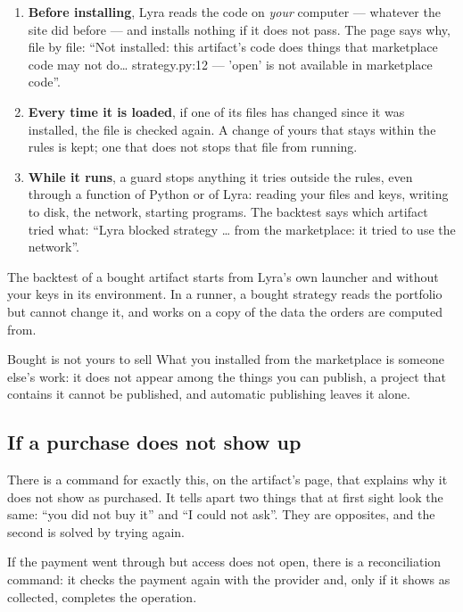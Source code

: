 \begin{enumerate}
  \item \textbf{Before installing}, Lyra reads the code on \emph{your}
        computer --- whatever the site did before --- and installs nothing if
        it does not pass. The page says why, file by file: \enquote{Not
        installed: this artifact's code does things that marketplace code may
        not do\ldots{} strategy.py:12 --- 'open' is not available in
        marketplace code}.
  \item \textbf{Every time it is loaded}, if one of its files has changed
        since it was installed, the file is checked again. A change of yours
        that stays within the rules is kept; one that does not stops that file
        from running.
  \item \textbf{While it runs}, a guard stops anything it tries outside the
        rules, even through a function of Python or of Lyra: reading your
        files and keys, writing to disk, the network, starting programs. The
        backtest says which artifact tried what: \enquote{Lyra blocked
        strategy \ldots{} from the marketplace: it tried to use the
        network}.
\end{enumerate}

\noindent
The backtest of a bought artifact starts from Lyra's own launcher and without
your keys in its environment. In a runner, a bought strategy reads the
portfolio but cannot change it, and works on a copy of the data the orders
are computed from.

\begin{nota}{Bought is not yours to sell}
What you installed from the marketplace is someone else's work: it does not
appear among the things you can publish, a project that contains it cannot
be published, and automatic publishing leaves it alone.
\end{nota}

\subsection{If a purchase does not show up}

There is a command for exactly this, on the artifact's page, that explains
why it does not show as purchased. It tells apart two things that at first
sight look the same: \enquote{you did not buy it} and \enquote{I could not
ask}. They are opposites, and the second is solved by trying again.

If the payment went through but access does not open, there is a
reconciliation command: it checks the payment again with the provider and,
only if it shows as collected, completes the operation.

